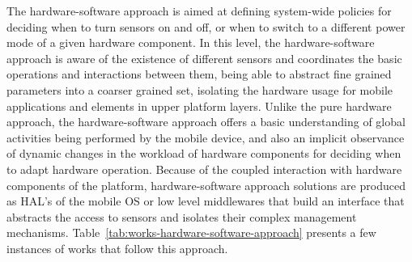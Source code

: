 \documentclass[ENG,PhD]{cinvestav}
\begin{document}
The hardware-software approach is aimed at defining system-wide policies for deciding when to turn sensors on and off, or when to switch to a different power mode of a given hardware component.
In this level, the hardware-software approach is aware of the existence of different sensors and coordinates the basic operations and interactions between them, being able to abstract fine grained parameters into a coarser grained set, isolating the hardware usage for mobile applications and elements in upper platform layers.
Unlike the pure hardware approach, the hardware-software approach offers a basic understanding of global activities being performed by the mobile device, and also an implicit observance of dynamic changes in the workload of hardware components for deciding when to adapt hardware operation.
Because of the coupled interaction with hardware components of the platform, hardware-software approach solutions are produced as HAL's of the mobile OS or low level middlewares that build an interface that abstracts the access to sensors and isolates their complex management mechanisms.
Table~\ref{tab:works-hardware-software-approach} presents a few instances of works that follow this approach.


\end{document}
